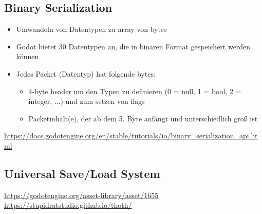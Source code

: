 \subsection{Binary Serialization}

\begin{itemize}
    \item Umwandeln von Datentypen zu array von bytes
    \item Godot bietet 30 Datentypen an, die in binären Format gespeichert werden können
    \item Jedes Packet (Datentyp) hat folgende bytes:
    \begin{itemize}
        \item 4-byte header um den Typen zu definieren (0 = null, 1 = bool, 2 = integer, ...) und zum setzen von flags
        \item Packetinhalt(e), der ab dem 5. Byte anfängt und unterschiedlich groß ist 
    \end{itemize}
\end{itemize}

\url{https://docs.godotengine.org/en/stable/tutorials/io/binary_serialization_api.html}

\subsection{Universal Save/Load System}
\url{https://godotengine.org/asset-library/asset/1655}\\
\url{https://stupidratstudio.github.io/thoth/}